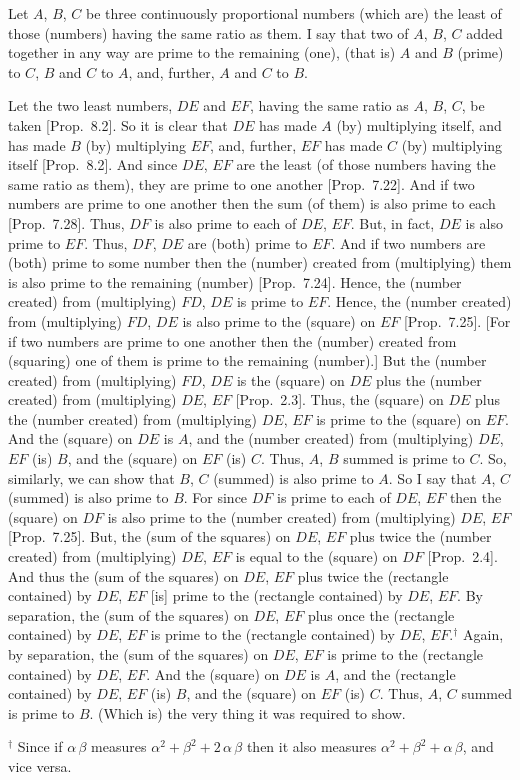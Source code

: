 \begin{Parallel}{}{}
{
\centerline{}

Let $A$, $B$, $C$ be three continuously proportional numbers (which are)
the least of those (numbers) having the same ratio as them. I say that two
of $A$, $B$, $C$ added together in any way are prime to the remaining
(one), (that is) $A$ and $B$ (prime) to $C$, $B$ and $C$ to
$A$, and, further, $A$ and $C$ to $B$.

Let the two least numbers, $DE$ and $EF$, having the same ratio as
$A$, $B$, $C$, be taken [Prop.~8.2]. So
it is clear that $DE$ has made $A$ (by) multiplying itself, and
has made $B$ (by) multiplying $EF$, and, further, $EF$ has made $C$ (by)
multiplying itself [Prop.~8.2]. And since $DE$, $EF$ are the least (of those numbers having the same ratio as them), 
they are prime to one another [Prop.~7.22]. 
And if two numbers are prime to one another then the sum (of them)
is also prime to each [Prop.~7.28]. Thus, $DF$
is also prime to each of $DE$, $EF$. But, in fact, $DE$ is  also prime to $EF$.
Thus, $DF$, $DE$ are (both) prime to $EF$. And if two numbers are (both)
prime to some number then the (number) created from (multiplying) them
is also prime to the remaining (number) [Prop.~7.24].
Hence, the (number created) from (multiplying) $FD$, $DE$ is prime
to $EF$. Hence, the (number created) from (multiplying) $FD$, $DE$ is also prime
to the (square) on $EF$ [Prop.~7.25]. 
[For if two numbers are prime to one another then the (number) created from
(squaring) one of them is prime to the remaining (number).]
But the (number created) from (multiplying) $FD$, $DE$ is the
(square) on $DE$ plus the (number created) from (multiplying) $DE$, $EF$
[Prop.~2.3]. Thus, the (square) on $DE$ plus
the (number created) from (multiplying) $DE$, $EF$ is prime to the
(square) on $EF$. 
And the (square)
on $DE$ is $A$, and the (number created) from (multiplying) $DE$, $EF$
(is) $B$, and the (square) on $EF$ (is) $C$. Thus,  $A$, $B$ summed is prime to $C$. So,  similarly, we can show that $B$, $C$ (summed) is also
prime to $A$. So I say that $A$, $C$ (summed) is also prime to $B$.
For since $DF$ is prime to each of $DE$, $EF$ then the (square) on
$DF$ is also prime to the (number created) from (multiplying) $DE$, $EF$
[Prop.~7.25]. But, the (sum of the squares) on $DE$, $EF$
plus twice the (number created) from (multiplying) $DE$, $EF$ is equal to
the (square) on $DF$ [Prop.~2.4]. And thus
the (sum of the squares) on $DE$, $EF$ plus twice  the (rectangle contained) by $DE$, $EF$ [is] prime to the (rectangle contained) by $DE$, $EF$.
By separation, the (sum of the squares) on $DE$, $EF$ plus  once the (rectangle contained) by $DE$, $EF$  is prime to the (rectangle contained)  by $DE$, $EF$.$^\dag$ Again, by separation,  the (sum of the squares) on $DE$, $EF$ is prime to the (rectangle contained)  by $DE$, $EF$. And the (square) on $DE$   is $A$,  and the (rectangle contained) by $DE$, $EF$ (is) $B$, and the (square) on $EF$ (is) $C$. Thus, $A$, $C$
summed is prime to $B$. (Which is) the very thing it was required to show.}
\end{Parallel}
{\footnotesize\noindent$^\dag$ Since if $\alpha\,\beta$ measures
$\alpha^2+\beta^2+2\,\alpha\,\beta$ then it also measures $\alpha^2+\beta^2+\alpha\,\beta$, and vice versa.}

